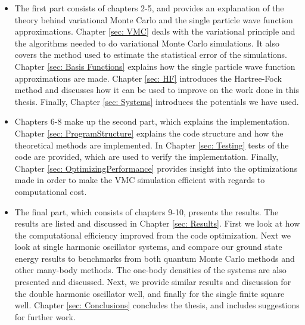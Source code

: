 \documentclass[../main.tex]{subfiles}
\begin{document}
\begin{itemize}
    \item The first part consists of chapters 2-5, and provides an explanation of the theory behind variational Monte Carlo and the single particle wave function approximations. Chapter \ref{sec: VMC} deals with the variational principle and the algorithms needed to do variational Monte Carlo simulations. It also covers the method used to estimate the statistical error of the simulations. Chapter \ref{sec: Basis Functions} explains how the single particle wave function approximations are made. Chapter \ref{sec: HF} introduces the Hartree-Fock method and discusses how it can be used to improve on the work done in this thesis. Finally, Chapter \ref{sec: Systems} introduces the potentials we have used.
    
    \item Chapters 6-8 make up the second part, which explains the implementation. Chapter \ref{sec: ProgramStructure} explains the code structure and how the theoretical methods are implemented. In Chapter \ref{sec: Testing} tests of the code are provided, which are used to verify the implementation. Finally, Chapter \ref{sec: OptimizingPerformance} provides insight into the optimizations made in order to make the VMC simulation efficient with regards to computational cost.
    
    \item The final part, which consists of chapters 9-10, presents the results. The results are listed and discussed in Chapter \ref{sec: Results}. First we look at how the computational efficiency improved from the code optimization. Next we look at single harmonic oscillator systems, and compare our ground state energy results to benchmarks from both quantum Monte Carlo methods and other many-body methods. The one-body densities of the systems are also presented and discussed. Next, we provide similar results and discussion for the double harmonic oscillator well, and finally for the single finite square well. Chapter \ref{sec: Conclusions} concludes the thesis, and includes suggestions for further work. 
\end{itemize}
\end{document}
